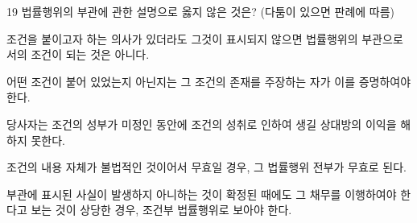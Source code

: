 \begin{question}{19}
법률행위의 부관에 관한 설명으로 옳지 않은 것은? (다툼이 있으면 판례에 따름)
\begin{choices}
  \item 조건을 붙이고자 하는 의사가 있더라도 그것이 표시되지 않으면 법률행위의 부관으로서의 조건이 되는 것은 아니다.
  \item 어떤 조건이 붙어 있었는지 아닌지는 그 조건의 존재를 주장하는 자가 이를 증명하여야 한다.
  \item 당사자는 조건의 성부가 미정인 동안에 조건의 성취로 인하여 생길 상대방의 이익을 해하지 못한다.
  \item 조건의 내용 자체가 불법적인 것이어서 무효일 경우, 그 법률행위 전부가 무효로 된다.
  \item 부관에 표시된 사실이 발생하지 아니하는 것이 확정된 때에도 그 채무를 이행하여야 한다고 보는 것이 상당한 경우, 조건부 법률행위로 보아야 한다.
\end{choices}
\end{question}
